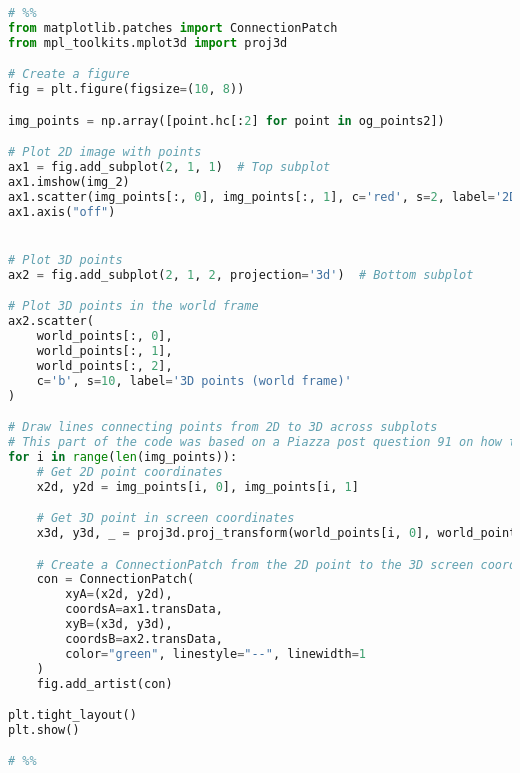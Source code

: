 \documentclass{article}
\begin{document}
\begin{lstlisting}[language=Python]
# %%
from matplotlib.patches import ConnectionPatch
from mpl_toolkits.mplot3d import proj3d

# Create a figure
fig = plt.figure(figsize=(10, 8))

img_points = np.array([point.hc[:2] for point in og_points2])

# Plot 2D image with points
ax1 = fig.add_subplot(2, 1, 1)  # Top subplot
ax1.imshow(img_2)
ax1.scatter(img_points[:, 0], img_points[:, 1], c='red', s=2, label='2D Points')  # Note x, y swap
ax1.axis("off")


# Plot 3D points
ax2 = fig.add_subplot(2, 1, 2, projection='3d')  # Bottom subplot

# Plot 3D points in the world frame
ax2.scatter(
    world_points[:, 0],
    world_points[:, 1],
    world_points[:, 2],
    c='b', s=10, label='3D points (world frame)'
)

# Draw lines connecting points from 2D to 3D across subplots
# This part of the code was based on a Piazza post question 91 on how to plot lines between both figure axes.
for i in range(len(img_points)):
    # Get 2D point coordinates
    x2d, y2d = img_points[i, 0], img_points[i, 1]

    # Get 3D point in screen coordinates
    x3d, y3d, _ = proj3d.proj_transform(world_points[i, 0], world_points[i, 1], world_points[i, 2], ax2.get_proj())

    # Create a ConnectionPatch from the 2D point to the 3D screen coordinates
    con = ConnectionPatch(
        xyA=(x2d, y2d),
        coordsA=ax1.transData,
        xyB=(x3d, y3d),
        coordsB=ax2.transData,
        color="green", linestyle="--", linewidth=1
    )
    fig.add_artist(con)

plt.tight_layout()
plt.show()

# %%
\end{lstlisting}
\end{document}
